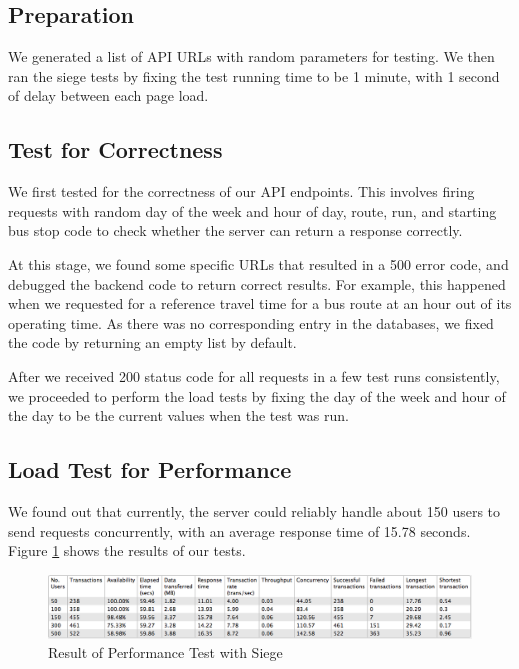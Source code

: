 \subsection{Preparation}
\par We generated a list of API URLs with random parameters for testing. We then ran the siege tests by fixing the test running time to be 1 minute, with 1 second of delay between each page load.

\subsection{Test for Correctness}
\par We first tested for the correctness of our API endpoints. This involves firing requests with random day of the week and hour of day, route, run, and starting bus stop code to check whether the server can return a response correctly.

\par At this stage, we found some specific URLs that resulted in a 500 error code, and debugged the backend code to return correct results. For example, this happened when we requested for a reference travel time for a bus route at an hour out of its operating time. As there was no corresponding entry in the databases, we fixed the code by returning an empty list by default.

\par After we received 200 status code for all requests in a few test runs consistently, we proceeded to perform the load tests by fixing the day of the week and hour of the day to be the current values when the test was run.

\subsection{Load Test for Performance}
\par We found out that currently, the server could reliably handle about 150 users to send requests concurrently, with an average response time of 15.78 seconds. Figure \ref{fig:performance} shows the results of our tests.

\begin{figure}
\centering
\includegraphics[width=\textwidth]{figures/performance.png}
\caption{\label{fig:performance} Result of Performance Test with Siege}
\end{figure}

